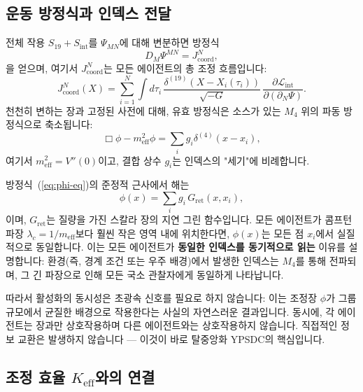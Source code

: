 \documentclass[11pt,a4paper]{article}
\begin{document}
	\subsection{운동 방정식과 인덱스 전달}
	
	전체 작용 \(S_{19} + S_{\mathrm{int}}\)를 \(\Psi_{MN}\)에 대해 변분하면 방정식
	\begin{equation}
		D_M \Psi^{MN} = J^{N}_{\mathrm{coord}},
		\label{eq:Psi-eq}
	\end{equation}
	을 얻으며, 여기서 \(J^{N}_{\mathrm{coord}}\)는 모든 에이전트의 총 조정 흐름입니다:
	\begin{equation}
		J^{N}_{\mathrm{coord}}(X) = \sum_{i=1}^{N} \int d\tau_i\, \frac{\delta^{(19)}(X - X_i(\tau_i))}{\sqrt{-G}}\, \frac{\partial \mathcal{L}_{\mathrm{int}}}{\partial (\partial_N \Psi)}.
	\end{equation}
	천천히 변하는 장과 고정된 사전에 대해, 유효 방정식은 소스가 있는 \(M_4\) 위의 파동 방정식으로 축소됩니다:
	\begin{equation}
		\Box \phi - m_{\mathrm{eff}}^2 \phi = \sum_{i} g_i \delta^{(4)}(x - x_i),
		\label{eq:phi-eq}
	\end{equation}
	여기서 \(m_{\mathrm{eff}}^2 = V''(0)\)이고, 결합 상수 \(g_i\)는 인덱스의 "세기"에 비례합니다.
	
	방정식~(\ref{eq:phi-eq})의 준정적 근사에서 해는
	\begin{equation}
		\phi(x) = \sum_i g_i \, G_{\mathrm{ret}}(x, x_i),
	\end{equation}
	이며, \(G_{\mathrm{ret}}\)는 질량을 가진 스칼라 장의 지연 그린 함수입니다. 모든 에이전트가 콤프턴 파장 \(\lambda_c = 1/m_{\mathrm{eff}}\)보다 훨씬 작은 영역 내에 위치한다면, \(\phi(x)\)는 모든 점 \(x_i\)에서 실질적으로 동일합니다. 이는 모든 에이전트가 \textbf{동일한 인덱스를 동기적으로 읽는} 이유를 설명합니다: 환경(즉, 경계 조건 또는 우주 배경)에서 발생한 인덱스는 \(M_4\)를 통해 전파되며, 그 긴 파장으로 인해 모든 국소 관찰자에게 동일하게 나타납니다.
	
	따라서 활성화의 동시성은 초광속 신호를 필요로 하지 않습니다: 이는 조정장 \(\phi\)가 그룹 규모에서 균질한 배경으로 작용한다는 사실의 자연스러운 결과입니다. 동시에, 각 에이전트는 장과만 상호작용하며 다른 에이전트와는 상호작용하지 않습니다. 직접적인 정보 교환은 발생하지 않습니다 — 이것이 바로 탈중앙화 YPSDC의 핵심입니다.
	
	\subsection{조정 효율 \(K_{\mathrm{eff}}\)와의 연결}
	
\end{document}
